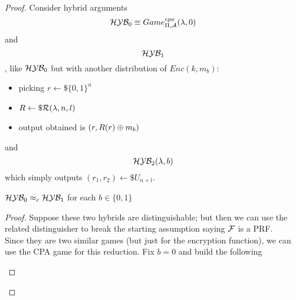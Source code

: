\begin{proof}
    Consider hybrid arguments
    \[
        \mathcal{H}\mathcal{Y}\mathcal{B}_{0} \equiv Game_{\Pi, \mathcal{A}}^{cpa}(\lambda, 0)
    \]
    and 
    \[ \mathcal{H}\mathcal{Y}\mathcal{B}_{1}\], like $\mathcal{H}\mathcal{Y}\mathcal{B}_{0}$ but with another distribution of $Enc(k,
    m_{b})$: \begin{itemize}
        \item picking $r \leftarrow\$ \{0,1\}^{n} $
        \item $R \leftarrow\$ \mathcal{R}(\lambda, n, l)$
        \item output obtained is $(r, R(r) \oplus m_{b})$
    \end{itemize}
    and 
    \[ \mathcal{H}\mathcal{Y}\mathcal{B}_{2}(\lambda, b)\] which simply outputs $(r_{1}, r_{2})
    \leftarrow\$ U_{n+l}$.

\begin{lemma}
    $\mathcal{H}\mathcal{Y}\mathcal{B}_{0} \approx_{c} \mathcal{H}\mathcal{Y}\mathcal{B}_{1}$ for each $b \in
    \{0,1\} 
    $
\end{lemma}
\begin{proof}
    Suppose these two hybrids are distinguishable; but then we can use the related
    distinguisher to break the starting assumption saying $\mathcal{F}$ is a PRF.\\

    Since they are two similar games (but just for the encryption function), we can use
    the CPA game for this reduction.
\newpage
    Fix $b=0$ and build the following


\begin{figure}[h!]
   \centering
   \sdinit{}
\end{figure}
\end{proof}
\end{proof}
